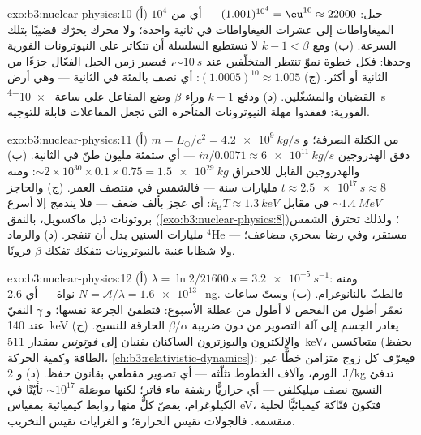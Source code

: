 \begin{solution}{exo:b3:nuclear-physics:10}
(أ) $10^4$ جيل: $(1.001)^{10^4} = \eu^{10} \approx
22000$ --- أي من الميغاواطات إلى عشرات الغيغاواطات في ثانية واحدة؛ ولا
محرك يحرّك قضيبًا بتلك السرعة. (ب) ومع $k - 1 < \beta$ لا تستطيع السلسلة
أن تتكاثر على النيوترونات الفورية وحدها: فكل خطوة نموّ
تنتظر المتخلّفين عند ${\sim}\qty{10}{s}$، فيصير زمن الجيل
الفعّال جزءًا من الثانية أو أكثر. (ج)
$(1.0005)^{10} \approx 1.005$: أي نصف بالمئة في الثانية ---
وهي أرض القضبان والمشغّلين. (د) ودفع $k - 1$ وراء $\beta$
وضع المفاعل على ساعة \qty{e-4}{s} الفورية: ففقدوا
مهلة النيوترونات المتأخرة التي تجعل المفاعلات قابلة للتوجيه.
\end{solution}

\begin{solution}{exo:b3:nuclear-physics:11}
(أ) $\dot m = L_\odot/c^2 = \qty{4.2e9}{kg/s}$ من الكتلة الصرفة؛ و
دفق الهدروجين $\dot m/0.0071 \approx \qty{6e11}{kg/s}$ ---
أي ستمئة مليون طنّ في الثانية. (ب) والهدروجين القابل للاحتراق
${\sim}2\times10^{30}\times0.1\times0.75 = \qty{1.5e29}{kg}$:
ومنه $t \approx \qty{2.5e17}{s} \approx 8$ مليارات سنة --- فالشمس
في منتصف العمر. (ج) والحاجز ${\sim}\qty{1.4}{MeV}$ في مقابل
$k_{\text{B}}T \approx \qty{1.3}{keV}$: أي عجز بألف ضعف
--- فلا يندمج إلا أسرع بروتونات ذيل ماكسويل، بالنفق
(\cref{exo:b3:nuclear-physics:8})؛ ولذلك تحترق الشمس
مليارات السنين بدل أن تنفجر. (د) والرماد
$^4$He --- مستقر، وفي رضا سحري مضاعف؛ ولا شظايا
غنية بالنيوترونات تتفكك تفكك $\beta$ قرونًا.
\end{solution}

\begin{solution}{exo:b3:nuclear-physics:12}
(أ) $\lambda = \ln2/\qty{21600}{s} = \qty{3.2e-5}{s^{-1}}$:
ومنه $N = \mathcal A/\lambda = \qty{1.6e13}{}$ نواة ---
أي \qty{2.6}{ng}. فالطبّ بالنانوغرام. (ب) وستّ ساعات تعمّر أطول
من الفحص لا أطول من عطلة الأسبوع: فتطفئ الجرعة نفسها؛ و
$\gamma$ النقيّ عند \qty{140}{keV} يغادر الجسم إلى آلة التصوير
من دون ضريبة $\alpha$/$\beta$ الحارقة للنسيج. (ج) والإلكترون
والبوزترون الساكنان يفنيان إلى \emph{فوتونين}
بمقدار \qty{511}{keV}، متعاكسين (بحفظ الطاقة وكمية الحركة،
\cref{ch:b3:relativistic-dynamics}): فيعرّف كل زوج متزامن
خطًّا عبر الورم، وآلاف الخطوط
تثلّثه --- أي تصوير مقطعي بقانون حفظ. (د) و
\qty{2}{J/kg} تدفئ النسيج نصف ميليكلفن --- أي حراريًّا
رشفة ماء فاتر؛ لكنها موصَلة ${\sim}10^{17}$ تأيّنًا
في الكيلوغرام، يقصّ كلٌّ منها روابط كيميائية بمقياس \unit{eV}، فتكون
فتّاكة كيميائيًّا لخلية منقسمة. فالجولات تقيس الحرارة؛ و
الغرايات تقيس التخريب.
\end{solution}

